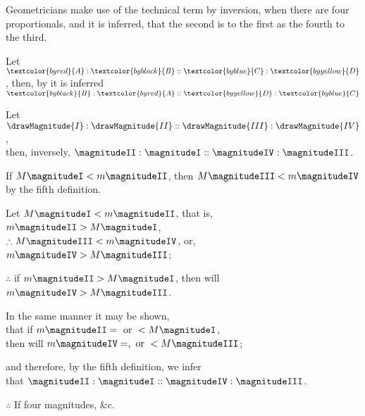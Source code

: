 \documentclass{byrne-book}
\begin{document}
\label{def:V.XIV} 
\def\varA{\textcolor{byred}{A}}
\def\varB{\textcolor{byblack}{B}}
\def\varC{\textcolor{byblue}{C}}
\def\varD{\textcolor{byyellow}{D}}
Geometricians make use of the technical term  by inversion, when there are four proportionals, and it is inferred, that the second is to the first as the fourth to the third.

Let $\varA : \varB :: \varC : \varD$, then, by  it is inferred $\varB : \varA :: \varD : \varC$

\vfill\pagebreak

\label{prop:V.B} %

\begin{center}
Let $\drawMagnitude{I} : \drawMagnitude{II} :: \drawMagnitude{III} : \drawMagnitude{IV}$,\\
then, inversely, $\magnitudeII : \magnitudeI :: \magnitudeIV : \magnitudeIII$.

If $M \magnitudeI < m \magnitudeII$, then $M \magnitudeIII < m \magnitudeIV$\\
by the fifth definition.

Let $M \magnitudeI < m \magnitudeII$, that is, $m \magnitudeII > M \magnitudeI$,\\
$\therefore M \magnitudeIII < m \magnitudeIV$, or, $m \magnitudeIV > M \magnitudeIII$;

$\therefore$ if $m \magnitudeII > M \magnitudeI$, then will $m \magnitudeIV > M \magnitudeIII$.

In the same manner it may be shown,\\
that if $m \magnitudeII = \mbox{ or } < M \magnitudeI$,\\
then will $m \magnitudeIV =, \mbox{ or } < M \magnitudeIII$;

and therefore, by the fifth definition, we infer\\
that $\magnitudeII : \magnitudeI :: \magnitudeIV : \magnitudeIII$.

$\therefore$ If four magnitudes, \&c.
\end{center}


\vfill\pagebreak
\end{document}
